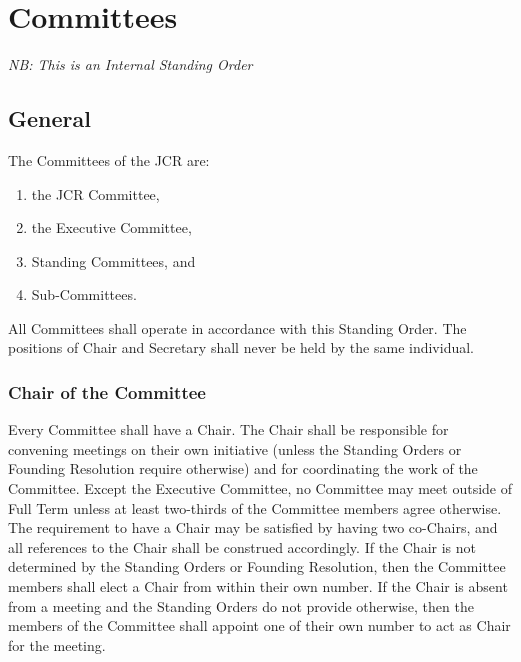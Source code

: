 \chapter{Committees}
\textit{NB: This is an Internal Standing Order}
\section{General}
\npara The Committees of the JCR are:
\begin{enumerate}
	\item the JCR Committee,
	\item the Executive Committee,
	\item Standing Committees, and
	\item Sub-Committees.
\end{enumerate}
\npara All Committees shall operate in accordance with this Standing Order.
\npara The positions of Chair and Secretary shall never be held by the same individual.
\subsection{Chair of the Committee}
\npara Every Committee shall have a Chair.
The Chair shall be responsible for convening meetings on their own initiative (unless the Standing Orders or Founding Resolution require otherwise) and for coordinating the work of the Committee.
Except the Executive Committee, no Committee may meet outside of Full Term unless at least two-thirds of the Committee members agree otherwise.
\npara The requirement to have a Chair may be satisfied by having two co-Chairs, and all references to the Chair shall be construed accordingly.
\npara If the Chair is not determined by the Standing Orders or Founding Resolution, then the Committee members shall elect a Chair from within their own number.
\npara If the Chair is absent from a meeting and the Standing Orders do not provide otherwise, then the members of the Committee shall appoint one of their own number to act as Chair for the meeting.
